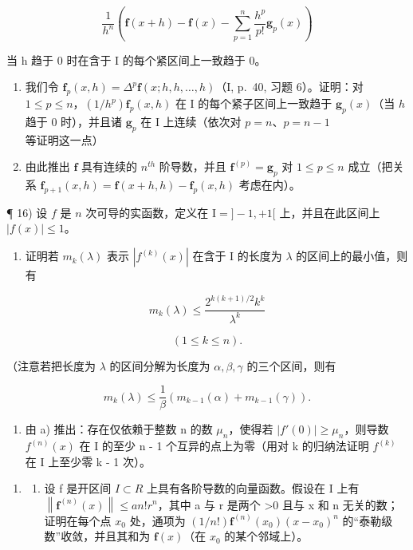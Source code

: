 \[
\frac {1}{h ^ {n}} \left(\mathbf {f} (x + h) - \mathbf {f} (x) - \sum_ {p = 1} ^ {n} \frac {h ^ {p}}{p !} \mathbf {g} _ {p} (x)\right)
\]

当 h 趋于 0 时在含于 I 的每个紧区间上一致趋于 0。

\begin{enumerate}
\def\labelenumi{\alph{enumi})}
\item
  我们令 \(\mathbf{f}_p(x,h) = \Delta^p\mathbf{f}(x;h,h,\ldots ,h)\)（I, p.~40, 习题 6）。证明：对 \(1\leqslant p\leqslant n\)，\((1 / h^{p})\mathbf{f}_{p}(x,h)\) 在 I 的每个紧子区间上一致趋于 \(\mathbf{g}_p(x)\)（当 \(h\) 趋于 0 时），并且诸 \(\mathbf{g}_p\) 在 I 上连续（依次对 \(p = n\)、\(p = n - 1\) 等证明这一点）
\item
  由此推出 \(\mathbf{f}\) 具有连续的 \(n^{th}\) 阶导数，并且 \(\mathbf{f}^{(p)} = \mathbf{g}_p\) 对 \(1 \leqslant p \leqslant n\) 成立（把关系 \(\mathbf{f}_{p+1}(x, h) = \mathbf{f}(x + h, h) - \mathbf{f}_p(x, h)\) 考虑在内）。
\end{enumerate}

¶ 16) 设 \(f\) 是 \(n\) 次可导的实函数，定义在 \(\mathrm{I} = ] - 1, + 1[\) 上，并且在此区间上 \(|f(x)|\leqslant 1\)。

\begin{enumerate}
\def\labelenumi{\alph{enumi})}
\tightlist
\item
  证明若 \(m_k(\lambda)\) 表示 \(|f^{(k)}(x)|\) 在含于 I 的长度为 \(\lambda\) 的区间上的最小值，则有
\end{enumerate}

\[
m _ {k} (\lambda) \leqslant \frac {2 ^ {k (k + 1) / 2} k ^ {k}}{\lambda^ {k}}
\]

\[
(1 \leqslant k \leqslant n).
\]

（注意若把长度为 \(\lambda\) 的区间分解为长度为 \(\alpha, \beta, \gamma\) 的三个区间，则有

\[
m _ {k} (\lambda) \leqslant \frac {1}{\beta} (m _ {k - 1} (\alpha) + m _ {k - 1} (\gamma)).
\]

\begin{enumerate}
\def\labelenumi{\alph{enumi})}
\setcounter{enumi}{1}
\tightlist
\item
  由 a) 推出：存在仅依赖于整数 n 的数 \(\mu_{n}\)，使得若 \(|f'(0)| \geqslant \mu_{n}\)，则导数 \(f^{(n)}(x)\) 在 I 的至少 n - 1 个互异的点上为零（用对 k 的归纳法证明 \(f^{(k)}\) 在 I 上至少零 k - 1 次）。
\end{enumerate}

\begin{enumerate}
\def\labelenumi{\arabic{enumi})}
\setcounter{enumi}{16}
\tightlist
\item
  \begin{enumerate}
  \def\labelenumii{\alph{enumii})}
  \tightlist
  \item
    设 f 是开区间 \(I \subset R\) 上具有各阶导数的向量函数。假设在 I 上有 \(\left\|\mathbf{f}^{(n)}(x)\right\| \leqslant a n!r^n\)，其中 a 与 r 是两个 \textgreater0 且与 x 和 n 无关的数；证明在每个点 \(x_0\) 处，通项为 \((1/n!) \mathbf{f}^{(n)}(x_0)(x - x_0)^n\) 的“泰勒级数”收敛，并且其和为 \(\mathbf{f}(x)\)（在 \(x_0\) 的某个邻域上）。
  \end{enumerate}
\end{enumerate}


